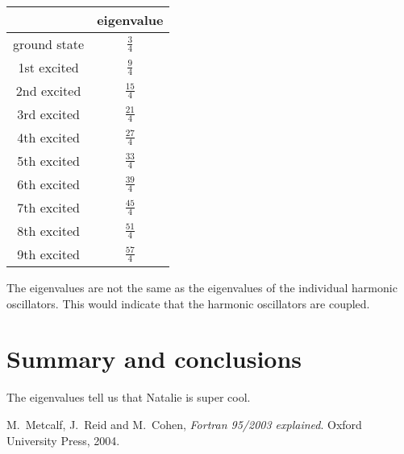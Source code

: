 \documentclass[12pt]{article}
\begin{document}
\begin{table}[h]
\centering
\begin{tabular}{cc}
\hline
             & eigenvalue \\ \hline\hline  
ground state & {$\frac{3}{4}$}         \\ [1ex]
1st excited  & {$\frac{9}{4}$}        \\ [1ex]
2nd excited  & {$\frac{15}{4}$}         \\ [1ex]
3rd excited  & {$\frac{21}{4}$}         \\ [1ex]
4th excited  & {$\frac{27}{4}$}        \\ [1ex]
5th excited  & {$\frac{33}{4}$}         \\ [1ex]
6th excited  & {$\frac{39}{4}$}         \\ [1ex]
7th excited  & {$\frac{45}{4}$}        \\ [1ex]
8th excited  & {$\frac{51}{4}$}        \\ [1ex]
9th excited  & {$\frac{57}{4}$}       \\  \hline
\end{tabular}
\end{table}

The eigenvalues are not the same as the eigenvalues of the individual harmonic oscillators. This would indicate that the harmonic oscillators are coupled.  


\section{Summary and conclusions}

The eigenvalues tell us that Natalie is super cool. 

\begin{thebibliography}{}


 M.\ Metcalf, J.\ Reid and M.\ Cohen, {\it Fortran 95/2003 explained}. Oxford University Press, 2004.
 

\end{thebibliography}
\end{document}
